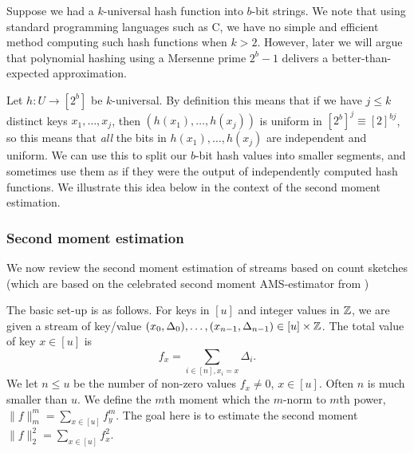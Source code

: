 Suppose we had a $k$-universal hash function into $b$-bit strings.
We note that using standard programming languages such as C, we have
no simple and efficient method computing such hash
functions when $k>2$. However, later we will argue that polynomial
hashing using a Mersenne prime $2^b-1$ delivers a better-than-expected
approximation.

Let $h:U\to [2^b]$ be $k$-universal. By definition this
means that if we have $j\leq k$ distinct keys $x_1,\ldots,x_j$, then
$(h(x_1),\ldots,h(x_j))$ is uniform in $[2^b]^j\equiv [2]^{bj}$,
so this means that \emph{all} the bits in $h(x_1),\ldots,h(x_j)$ are
independent and uniform. We can use this to split our $b$-bit hash
values into smaller segments, and sometimes use them as if
they were the output of independently computed hash functions.
We illustrate this idea below in the context of the second moment estimation.

\subsubsection{Second moment estimation}
We now review the second moment estimation of streams based on count
sketches \cite{charikar04count-sketch} (which are based on the
celebrated second moment AMS-estimator from \cite{alon96frequency})

The basic set-up is as follows.  For keys in $[u]$ and integer values in $\mathbb Z$, we are given a stream of key/value $(x_0,\Delta_0),\ldots, (x_{n-1},\Delta_{n-1})\in [u]\times\mathbb Z$. The
total value of key $x\in[u]$ is
\[f_x=\sum_{i\in[n],x_i=x} \Delta_i.\]
We let $n\leq u$ be  the number of non-zero values
$f_x\neq 0$, $x\in [u]$. Often $n$ is much smaller than $u$.
We define the $m$th moment which the $m$-norm to $m$th power,
$\|f\|_m^m = \sum_{x\in [u]}f_y^m$. The goal here is to
estimate the second moment $\|f\|_2^2 = \sum_{x\in [u]}f_x^2$. 

